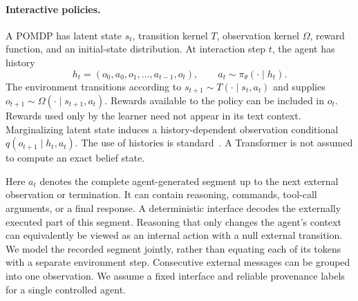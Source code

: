 \documentclass{article} %
\begin{document}
\paragraph{Interactive policies.}
A POMDP has latent state $s_t$, transition kernel $T$, observation kernel $\Omega$, reward function, and an initial-state distribution. At interaction step $t$, the agent has history
\begin{equation}
 h_t=(o_0,a_0,o_1,\ldots,a_{t-1},o_t),\qquad
 a_t\sim\pi_\theta(\cdot\mid h_t).
\end{equation}
The environment transitions according to $s_{t+1}\sim T(\cdot\mid s_t,a_t)$ and supplies $o_{t+1}\sim\Omega(\cdot\mid s_{t+1},a_t)$. Rewards available to the policy can be included in $o_t$. Rewards used only by the learner need not appear in its text context. Marginalizing latent state induces a history-dependent observation conditional $q(o_{t+1}\mid h_t,a_t)$. The use of histories is standard~\citep{kaelbling1998planning}. A Transformer is not assumed to compute an exact belief state.

Here $a_t$ denotes the complete agent-generated segment up to the next external observation or termination. It can contain reasoning, commands, tool-call arguments, or a final response. A deterministic interface decodes the externally executed part of this segment. Reasoning that only changes the agent's context can equivalently be viewed as an internal action with a null external transition. We model the recorded segment jointly, rather than equating each of its tokens with a separate environment step. Consecutive external messages can be grouped into one observation. We assume a fixed interface and reliable provenance labels for a single controlled agent.
\end{document}
